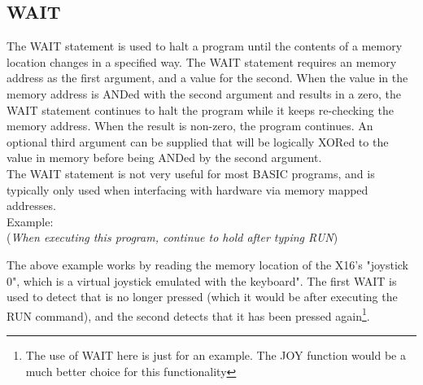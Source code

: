 \subsection{WAIT}

The {\ttfamily WAIT} statement is used to halt a program until the contents of
a memory location changes in a specified way.  The {\ttfamily WAIT} statement
requires an memory address as the first argument, and a value for the second.
When the value in the memory address is {\ttfamily AND}ed with the second
argument and results in a zero, the {\ttfamily WAIT} statement continues to
halt the program while it keeps re-checking the memory address.  When the
result is non-zero, the program continues.  An optional third argument can be
supplied that will be logically {\ttfamily XOR}ed to the value in memory before
being {\ttfamily AND}ed by the second argument.\\

The {\ttfamily WAIT} statement is not very useful for most BASIC programs, and
is typically only used when interfacing with hardware via memory mapped
addresses.\\

Example:\\

(\emph{When executing this program, continue to hold
 after typing
{\ttfamily RUN}})\\


The above example works by reading the memory location of the X16's "joystick
0", which is a virtual joystick emulated with the keyboard".  The first
{\ttfamily WAIT} is used to detect that  is no longer pressed
(which it would be after executing the {\ttfamily RUN} command), and the second
detects that it has been pressed again\footnote{The use of {\ttfamily WAIT}
here is just for an example.  The {\ttfamily JOY} function would be a much
better choice for this functionality}.\\


